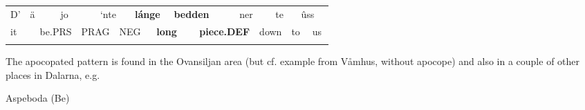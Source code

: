 \begin{tabular}{llllllllllllllllll}
\lsptoprule
D’ & \multicolumn{2}{l}{ä

} & \multicolumn{2}{l}{jo

} & \multicolumn{2}{l}{‘nte

} & \multicolumn{2}{l}{{\bfseries lánge}

} & \multicolumn{2}{l}{{\bfseries bedden}

} & \multicolumn{2}{l}{ner

} & \multicolumn{2}{l}{te

} & \multicolumn{2}{l}{ûss

} & \\
\multicolumn{2}{l}{it

} & \multicolumn{2}{l}{be.PRS

} & \multicolumn{2}{l}{PRAG

} & \multicolumn{2}{l}{NEG

} & \multicolumn{2}{l}{{\bfseries long}

} & \multicolumn{2}{l}{{\bfseries piece.DEF}

} & \multicolumn{2}{l}{down

} & \multicolumn{2}{l}{to

} & \multicolumn{2}{l}{us

}\\
\lspbottomrule
\end{tabular}

The apocopated pattern is found in the Ovansiljan area (but cf. example from Våmhus, without apocope) and also in a couple of other places in Dalarna, e.g.

\begin{listWWNumileveli}
\item {}

\begin{styleExample}
Aspeboda (Be)

\end{styleExample}

\end{listWWNumileveli}


